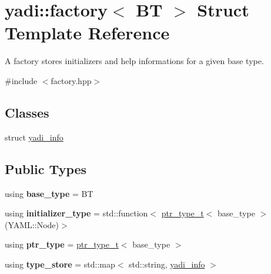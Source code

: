 \hypertarget{structyadi_1_1factory}{}\section{yadi\+:\+:factory$<$ BT $>$ Struct Template Reference}
\label{structyadi_1_1factory}


A factory stores initializers and help informations for a given base type.  




{\ttfamily \#include $<$factory.\+hpp$>$}

\subsection*{Classes}
\begin{DoxyCompactItemize}
\item 
struct \hyperlink{structyadi_1_1factory_1_1yadi__info}{yadi\+\_\+info}
\end{DoxyCompactItemize}
\subsection*{Public Types}
\begin{DoxyCompactItemize}
\item 
\mbox{\label{structyadi_1_1factory_aa53aaa7d106c458d492e767d39c93369}} 
using {\bfseries base\+\_\+type} = BT
\item 
\mbox{\label{structyadi_1_1factory_abda283c5fcd47651b797b8f2dd29a122}} 
using {\bfseries initializer\+\_\+type} = std\+::function$<$ \hyperlink{namespaceyadi_a92290eb27cd90666aa87b17d854af9fe}{ptr\+\_\+type\+\_\+t}$<$ base\+\_\+type $>$(Y\+A\+M\+L\+::\+Node)$>$
\item 
\mbox{\label{structyadi_1_1factory_a6e477a43b3072583702cc388e8028b47}} 
using {\bfseries ptr\+\_\+type} = \hyperlink{namespaceyadi_a92290eb27cd90666aa87b17d854af9fe}{ptr\+\_\+type\+\_\+t}$<$ base\+\_\+type $>$
\item 
\mbox{\label{structyadi_1_1factory_a4d95d91a535e999a61357303812130b2}} 
using {\bfseries type\+\_\+store} = std\+::map$<$ std\+::string, \hyperlink{structyadi_1_1factory_1_1yadi__info}{yadi\+\_\+info} $>$
\end{DoxyCompactItemize}
